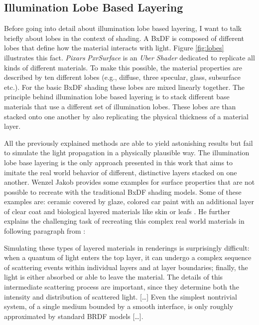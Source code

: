 	\subsection{Illumination Lobe Based Layering}\label{sec:illuminationLobeLayering}

	Before going into detail about illumination lobe based layering, I want to talk briefly about lobes in the context of shading. A BxDF is composed of different lobes that define how the material interacts with light. Figure \ref{fig:lobes} illustrates this fact. \emph{Pixars} \emph{PxrSurface} is an \emph{Uber Shader} dedicated to replicate all kinds of different materials. To make this possible, the material properties are described by ten different lobes (e.g., diffuse, three specular, glass, subsurface etc.). For the basic BxDF shading these lobes are mixed linearly together. The principle behind illumination lobe based layering is to stack different base materials that use a different set of illumination lobes. These lobes are than stacked onto one another by also replicating the physical thickness of a material layer.   
	
	All the previously explained methods are able to yield astonishing results but fail to simulate the light propagation in a physically plausible way. The illumination lobe base layering is the only approach presented in this work that aims to imitate the real world behavior of different, distinctive layers stacked on one another. Wenzel Jakob provides some examples for surface properties that are not possible to recreate with the traditional BxDF shading models. Some of these examples are: ceramic covered by glaze, colored car paint with an additional layer of clear coat and biological layered materials like skin or leafs \cite[p.\,1]{jakob2015layerlab}. He further explains the challenging task of recreating this complex real world materials in following paragraph from \cite[p.\,1]{jakob2015layerlab}:
	
	
	\begin{itquote}
		Simulating these types of layered materials in renderings is surprisingly difficult: when a quantum	of light enters the top layer, it can undergo a complex sequence of scattering events within individual layers and at layer boundaries; finally, the light is either absorbed or able to leave the material. The	details of this intermediate scattering process are important, since they determine both the intensity and distribution of scattered light. [\ldots] Even the simplest nontrivial system, of a single medium bounded by a smooth interface, is only roughly approximated by standard BRDF models [\ldots].
	\end{itquote} 
	
